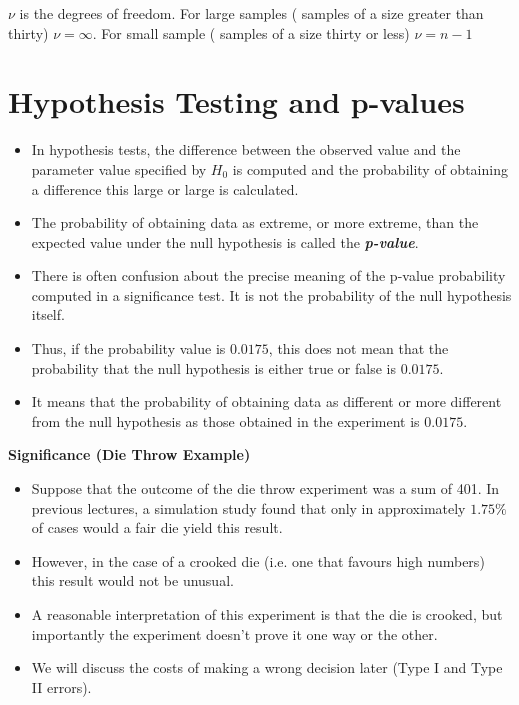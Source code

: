 $\nu$ is the degrees of freedom. For large samples ( samples of a
size greater than thirty) $\nu = \infty$. For small sample (
samples of a size thirty or less)  $\nu = n-1$


\section{Hypothesis Testing and p-values}
\begin{itemize}
\item In hypothesis tests, the difference between the observed value and the parameter value specified by $H_0$ is computed and the probability of obtaining a difference this large or large is calculated.
\item The probability of obtaining data as extreme, or more extreme, than the expected value under the null hypothesis is called the \textbf{\emph{p-value}}.
\item There is often confusion about the precise meaning of the p-value probability computed in a significance test. It is not the probability of the null hypothesis itself.
\item Thus, if the probability value is $0.0175$, this does not mean that the probability that the null hypothesis is either true or false is $0.0175$.
\item It means that the probability of obtaining data as different or more different from the null hypothesis as those obtained in the experiment is $0.0175$.
\end{itemize}

\textbf{Significance (Die Throw Example)}
\begin{itemize}
\item Suppose that the outcome of the die throw experiment was a sum of 401. In previous lectures, a simulation study found that only in approximately $1.75\%$ of cases would a fair die yield this result.
\item However, in the case of a crooked die (i.e. one that favours high numbers) this result would not be unusual.
\item A reasonable interpretation of this experiment is that the die is crooked, but importantly the experiment doesn't prove it one way or the other.
\item We will discuss the costs of making a wrong decision later (Type I and Type II errors).
\end{itemize}







